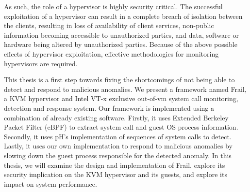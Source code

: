 \documentclass{report}
\begin{document}
\begin{spacing}{1.5}
{\large 
As such, the role of a hypervisor is highly security critical. The successful exploitation of a hypervisor can result in a complete breach of isolation between the clients, resulting in loss of availability of client services, non-public information becoming accessible to unauthorized parties, and data, software or hardware being altered by unauthorized parties. Because of the above possible effects of hypervisor exploitation, effective methodologies for monitoring hypervisors are required.
\newline
}


{\large 
This thesis is a first step towards fixing the shortcomings of not being able to detect and respond to malicious anomalies. We present a framework named Frail, a KVM hypervisor and Intel VT-x exclusive out-of-vm system call monitoring, detection and response system. Our framework is implemented using a combination of already existing software. Firstly, it uses Extended Berkeley Packet Filter (eBPF) to extract system call and guest OS process information. Secondly, it uses pH's implementation of sequences of system calls to detect. Lastly, it uses our own implementation to respond to malicious anomalies by slowing down the guest process responsible for the detected anomaly. In this thesis, we will examine the design and implementation of Frail, explore its security implication on the KVM hypervisor and its guests, and explore its impact on system performance.
\newline}



















































\end{spacing}
\end{document}
